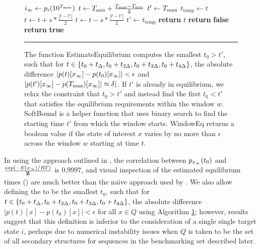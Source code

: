 \begin{figure}[!ht]
\begin{algorithmic}[1]
\State $i_{\infty} \gets p_i(10^{T_{\max}})$
\State $t \gets T_{\min} + \frac{T_{\max} - T_{\min}}{2}$
\State $t' \gets T_{\max}$
\State $t_{\text{temp}} \gets t$
\State $t \gets t + s * \frac{|t - t'|}{2}$
\Else
\State $t \gets t - s * \frac{|t - t'|}{2}$
\EndIf
\State $t' \gets t_{\text{temp}}$
\EndWhile
\State \textbf{return} $t$
\EndFunction
{}
\State \textbf{return} \textbf{false}
\EndIf
\EndFor
\State \textbf{return} \textbf{true}
\EndFunction
\rule[-0.35ex]{0pt}{0pt}
\end{algorithmic}
\caption{The function {\sc EstimateEquilibrium} computes the smallest $t_0 > t'$,
such that for $t \in \{t_0+t_{\Delta},t_0+t_{2\Delta},t_0+t_{3\Delta},t_0+t_{4\Delta}\}$,
the absolute difference $|p(t)[x_\infty] - p(t_0)[x_\infty]| < \epsilon$ and
$|p(t')[x_\infty] - p(T_{\max})[x_\infty]| \approx \delta|$. If $t'$ is already in
equilibrium, we relax the constraint that $t_0 > t'$ and instead find the
first $t_0 < t'$ that satisfies the equilibrium requirements within the window
$w$. {\sc SoftBound} is a helper function that uses binary search to find the
starting time $t'$ from which the window starts. {\sc WindowEq} returns a
boolean value if the state of interest $x$ varies by no more than $\epsilon$
across the window $w$ starting at time $t$.}
\label{fig:hermes:eqEst}
\rule[0ex]{0pt}{1.5em} \hrule
\end{figure}

In using the approach outlined in , the correlation
between $p_{x_\infty}(t_0)$ and $\frac{\exp(-E(x_\infty)/RT)}{{\bf Z}^{}_{}}$ is $0.9997$, and
visual inspection of the estimated equilibrium times
() are much better than the
na\"{\i}ve approach used by \treekin. We also allow defining the \eqt to be the
smallest $t_0$, such that for
$t \in \{t_0+t_{\Delta},t_0+t_{2\Delta},t_0+t_{3\Delta},t_0+t_{4\Delta}\}$, the
absolute difference $|p(t)[x] - p(t_0)[x]| < \epsilon$ for all $x \in
Q$ using Algorithm \ref{fig:hermes:eqEst};
however, results suggest that this definition is inferior
to the consideration of a single single target state $i$,
perhaps due to numerical instability issues when
$Q$ is taken to be the set of all secondary structures for sequences in
the benchmarking set described later.

